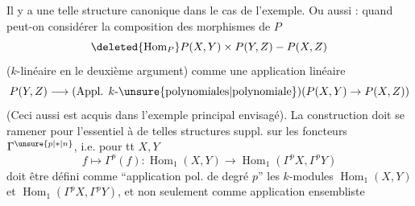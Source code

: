 Il y a une telle structure
canonique dans le cas de l'exemple.
Ou aussi : quand peut-on considérer
la composition des morphismes de $P$
\[
\deleted{\operatorname{Hom}_P}P(X,Y)\times P(Y,Z)-P(X,Z)
\]
($k$-linéaire en le deuxième argument)
comme une application linéaire
\[
P(Y,Z)\longrightarrow(\text{Appl. $k$-\unsure{polynomiales|polynomiale}})(P(X,Y)\to P(X,Z))
\]
(Ceci aussi est acquis dans l'exemple principal envisagé). La
construction doit se ramener pour
l'essentiel à  de telles
structures suppl. sur les foncteurs $\Gamma^{\unsure{p|*|n}}$,
i.e. pour tt $X,Y$
\[
f\longmapsto\Gamma^p(f):\operatorname{Hom}_1(X,Y)\longrightarrow\operatorname{Hom}_1(\Gamma^p X,\Gamma^p Y)
\]
doit être défini comme ``application pol. de
degré $p$''  les $k$-modules
$\operatorname{Hom}_1(X,Y)$ et $\operatorname{Hom}_1(\Gamma^p X,\Gamma^p Y)$, et non
seulement comme application ensembliste

